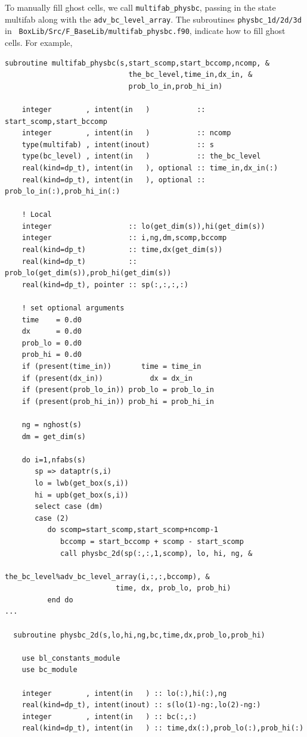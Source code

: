 To manually fill ghost cells, we call {\tt multifab\_physbc}, passing
in the state multifab along with the {\tt adv\_bc\_level\_array}.  The
subroutines {\tt physbc\_1d/2d/3d} in {\tt
  BoxLib/Src/F\_BaseLib/multifab\_physbc.f90}, indicate how to fill
ghost cells.  For example,
\begin{lstlisting}[backgroundcolor=\color{light-green}]
  subroutine multifab_physbc(s,start_scomp,start_bccomp,ncomp, &
                             the_bc_level,time_in,dx_in, &
                             prob_lo_in,prob_hi_in)

    integer        , intent(in   )           :: start_scomp,start_bccomp
    integer        , intent(in   )           :: ncomp
    type(multifab) , intent(inout)           :: s
    type(bc_level) , intent(in   )           :: the_bc_level
    real(kind=dp_t), intent(in   ), optional :: time_in,dx_in(:)
    real(kind=dp_t), intent(in   ), optional :: prob_lo_in(:),prob_hi_in(:)

    ! Local
    integer                  :: lo(get_dim(s)),hi(get_dim(s))
    integer                  :: i,ng,dm,scomp,bccomp
    real(kind=dp_t)          :: time,dx(get_dim(s))
    real(kind=dp_t)          :: prob_lo(get_dim(s)),prob_hi(get_dim(s))
    real(kind=dp_t), pointer :: sp(:,:,:,:)
    
    ! set optional arguments
    time    = 0.d0
    dx      = 0.d0
    prob_lo = 0.d0
    prob_hi = 0.d0
    if (present(time_in))       time = time_in
    if (present(dx_in))           dx = dx_in
    if (present(prob_lo_in)) prob_lo = prob_lo_in
    if (present(prob_hi_in)) prob_hi = prob_hi_in

    ng = nghost(s)
    dm = get_dim(s)
    
    do i=1,nfabs(s)
       sp => dataptr(s,i)
       lo = lwb(get_box(s,i))
       hi = upb(get_box(s,i))
       select case (dm)
       case (2)
          do scomp=start_scomp,start_scomp+ncomp-1
             bccomp = start_bccomp + scomp - start_scomp
             call physbc_2d(sp(:,:,1,scomp), lo, hi, ng, &
                          the_bc_level%adv_bc_level_array(i,:,:,bccomp), &
                          time, dx, prob_lo, prob_hi)
          end do
...

  subroutine physbc_2d(s,lo,hi,ng,bc,time,dx,prob_lo,prob_hi)

    use bl_constants_module
    use bc_module

    integer        , intent(in   ) :: lo(:),hi(:),ng
    real(kind=dp_t), intent(inout) :: s(lo(1)-ng:,lo(2)-ng:)
    integer        , intent(in   ) :: bc(:,:)
    real(kind=dp_t), intent(in   ) :: time,dx(:),prob_lo(:),prob_hi(:)


\end{lstlisting}
